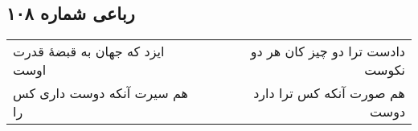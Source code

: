 \begin{center}
\section*{رباعی شماره ۱۰۸}
\label{sec:sh108}
\begin{longtable}{l p{0.5cm} r}
ایزد که جهان به قبضهٔ قدرت اوست
&&
دادست ترا دو چیز کان هر دو نکوست
\\
هم سیرت آنکه دوست داری کس را
&&
هم صورت آنکه کس ترا دارد دوست
\\
\end{longtable}
\end{center}
